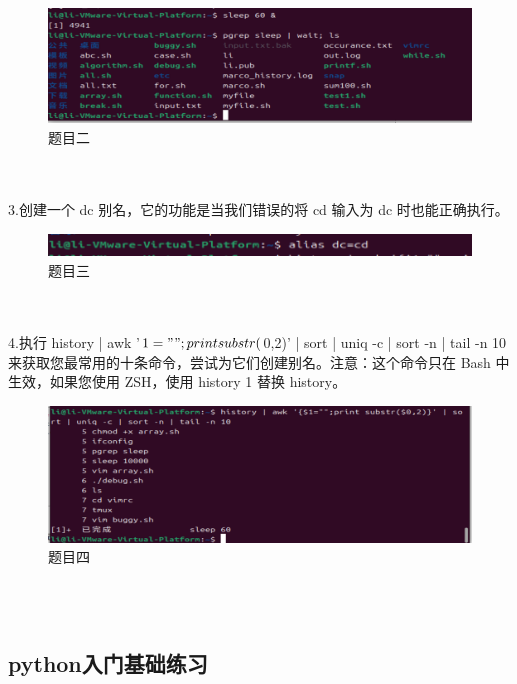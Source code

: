 \documentclass[a4paper, 12pt]{article}
\begin{document}
\begin{figure}[H]
  \centering
  \includegraphics[width=1\textwidth]{屏幕截图 2024-09-12 232207.png}
  \caption{题目二}
    \end{figure}
\\
\\
\noindent 3.创建一个 dc 别名，它的功能是当我们错误的将 cd 输入为 dc 时也能正确执行。
\begin{figure}[H]
  \centering
  \includegraphics[width=1\textwidth]{屏幕截图 2024-09-12 232321.png}
  \caption{题目三}
    \end{figure}
\\
\\
\noindent 4.执行 history | awk '{$1="";print substr($0,2)}' | sort | uniq -c | sort -n | tail -n 10 来获取您最常用的十条命令，尝试为它们创建别名。注意：这个命令只在 Bash 中生效，如果您使用 ZSH，使用 history 1 替换 history。
\begin{figure}[H]
  \centering
  \includegraphics[width=1\textwidth]{屏幕截图 2024-09-12 232333.png}
  \caption{题目四}
    \end{figure}
\\
\\
\subsection{python入门基础练习}
\end{document}
